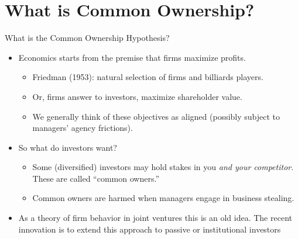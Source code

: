 \documentclass[handout,aspectratio=169,10pt]{beamer}
\begin{document}



\section{What is Common Ownership?}

\begin{frame}[plain]{What is the Common Ownership Hypothesis?}
\begin{itemize}
\item Economics starts from the premise that firms maximize profits.
\begin{itemize}
\item Friedman (1953): natural selection of firms and billiards players.
\item Or, firms answer to investors, \alert{maximize shareholder value}.
\item We generally think of these objectives as aligned (possibly subject to managers' agency frictions).
\end{itemize}
\item So what do investors want?
\begin{itemize}
\item Some (diversified) investors may hold stakes in you \textit{and your competitor}. These are called ``common owners.''
\item Common owners are harmed when managers engage in \alert{business stealing}.
\end{itemize}
\item As a theory of firm behavior in \alert{joint ventures} this is an old idea. The recent innovation is to extend this approach to \alert{passive or institutional investors}
\end{itemize}
\end{frame}
\end{document}
